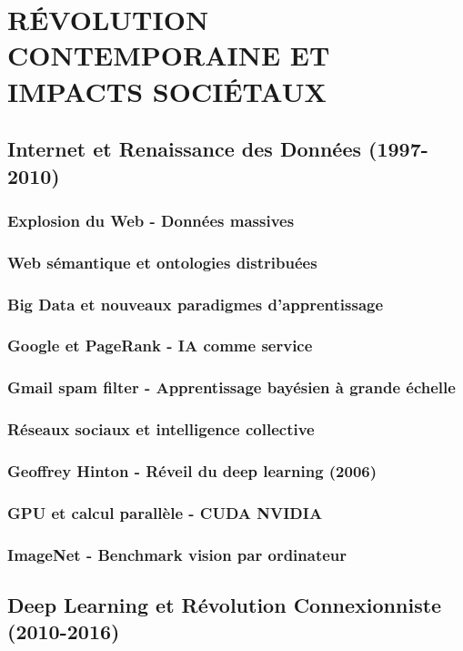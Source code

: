 \documentclass[12pt,a4paper]{book}
\begin{document}
\part{RÉVOLUTION CONTEMPORAINE ET IMPACTS SOCIÉTAUX}

\chapter{Internet et Renaissance des Données (1997-2010)}
\section{Explosion du Web - Données massives}
\section{Web sémantique et ontologies distribuées}
\section{Big Data et nouveaux paradigmes d'apprentissage}
\section{Google et PageRank - IA comme service}
\section{Gmail spam filter - Apprentissage bayésien à grande échelle}
\section{Réseaux sociaux et intelligence collective}
\section{Geoffrey Hinton - Réveil du deep learning (2006)}
\section{GPU et calcul parallèle - CUDA NVIDIA}
\section{ImageNet - Benchmark vision par ordinateur}

\chapter{Deep Learning et Révolution Connexionniste (2010-2016)}
\end{document}

